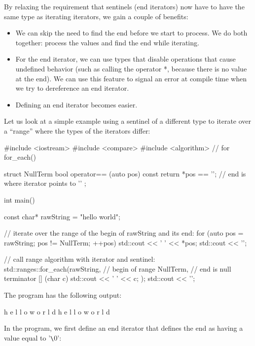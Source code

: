 By relaxing the requirement that sentinels (end iterators) now have to have the same type as iterating iterators, we gain a couple of benefits:

\begin{itemize}
\item
We can skip the need to find the end before we start to process. We do both together: process the values and find the end while iterating.

\item
For the end iterator, we can use types that disable operations that cause undefined behavior (such as calling the operator *, because there is no value at the end). We can use this feature to signal an error at compile time when we try to dereference an end iterator.

\item
Defining an end iterator becomes easier.
\end{itemize}

Let us look at a simple example using a sentinel of a different type to iterate over a “range” where the types of the iterators differ:


\begin{cpp}
#include <iostream>
#include <compare>
#include <algorithm> // for for_each()

struct NullTerm {
	bool operator== (auto pos) const {
		return *pos == '\0'; // end is where iterator points to ’\0’
	}
};

int main()
{
	const char* rawString = "hello world";
	
	// iterate over the range of the begin of rawString and its end:
	for (auto pos = rawString; pos != NullTerm{}; ++pos) {
		std::cout << ' ' << *pos;
	}
	std::cout << '\n';
	
	// call range algorithm with iterator and sentinel:
	std::ranges::for_each(rawString, // begin of range
				NullTerm{}, // end is null terminator
				[] (char c) {
					std::cout << ' ' << c;
				});
	std::cout << '\n';
}
\end{cpp}

The program has the following output:

\begin{shell}
h e l l o   w o r l d
h e l l o   w o r l d
\end{shell}

In the program, we first define an end iterator that defines the end as having a value equal to ’\verb|\|0’:

